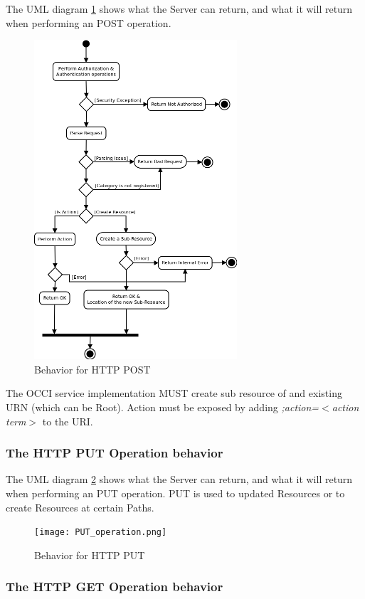 \documentclass[10pt,a4paper]{article}
\begin{document}
The UML diagram \ref{fig:post_operation} shows what the Server can return, and what it will return when performing an POST operation.

\clearpage
\begin{figure}[!h]
	\centering
	\includegraphics[scale=0.4]{POST_operation.png}
	\caption{Behavior for HTTP POST}
	\label{fig:post_operation}
\end{figure}

The OCCI service implementation MUST create sub resource of and existing URN (which can be Root). Action must be exposed by adding \emph{;action=$<$action term$>$} to the URI.

\subsubsection{The HTTP PUT Operation behavior}

The UML diagram \ref{fig:put_operation} shows what the Server can return, and what it will return when performing an PUT operation. PUT is used to updated Resources or to create Resources at certain Paths.

\clearpage
\begin{figure}[!h]
	\centering
	\texttt{[image: PUT\_operation.png]}
	\caption{Behavior for HTTP PUT}
	\label{fig:put_operation}
\end{figure}

\subsubsection{The HTTP GET Operation behavior}
\end{document}
